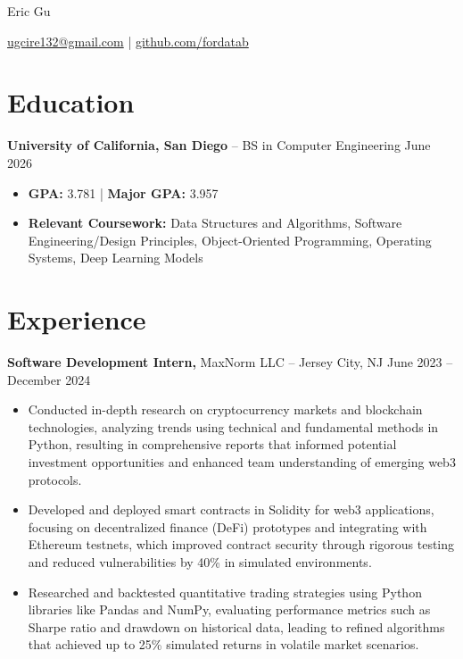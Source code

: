 \documentclass[11pt]{article}       %
\begin{document}
\centerline{\Huge Eric Gu}

\vspace{-4pt}

\centerline{\href{mailto:ugcire132@gmail.com}{ugcire132@gmail.com} |  \href{github.com/fordatab}{github.com/fordatab}}

\vspace{-18.5pt}

\section*{Education}
\textbf{University of California, San Diego} -- BS in Computer Engineering  \hfill June 2026\begin{itemize}[leftmargin=*, nosep]
    \item \textbf{GPA:} 3.781 | \textbf{Major GPA:} 3.957
    \item \textbf{Relevant Coursework:} Data Structures and Algorithms, Software Engineering/Design Principles, Object-Oriented Programming, Operating Systems, Deep Learning Models
\end{itemize}


\vspace{-18.5pt}

\section*{Experience}
\textbf{Software Development Intern,} {MaxNorm LLC} -- Jersey City, NJ \hfill June 2023 -- December 2024 \
\vspace{-9pt}
\begin{itemize}
\item Conducted in-depth research on cryptocurrency markets and blockchain technologies, analyzing trends using technical and fundamental methods in Python, resulting in comprehensive reports that informed potential investment opportunities and enhanced team understanding of emerging web3 protocols.
\item Developed and deployed smart contracts in Solidity for web3 applications, focusing on decentralized finance (DeFi) prototypes and integrating with Ethereum testnets, which improved contract security through rigorous testing and reduced vulnerabilities by 40\% in simulated environments.
\item Researched and backtested quantitative trading strategies using Python libraries like Pandas and NumPy, evaluating performance metrics such as Sharpe ratio and drawdown on historical data, leading to refined algorithms that achieved up to 25\% simulated returns in volatile market scenarios.
\end{itemize}
\end{document}
